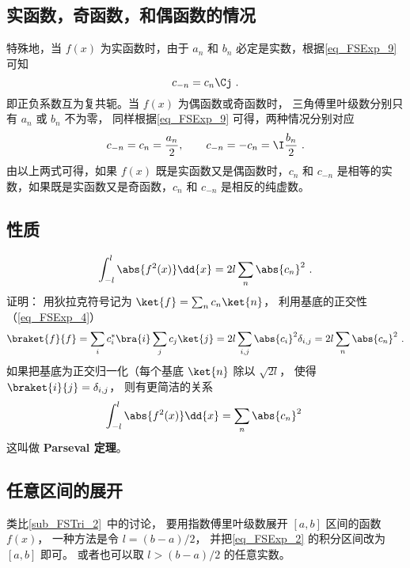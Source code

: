 \subsection{实函数，奇函数，和偶函数的情况}
特殊地，当 $f(x)$ 为实函数时，由于 $a_n$ 和 $b_n$ 必定是实数，根据\autoref{eq_FSExp_9} 可知
\begin{equation}
c_{-n} = c_{n}\Cj~.
\end{equation}
即正负系数互为复共轭。当 $f(x)$ 为偶函数或奇函数时， 三角傅里叶级数分别只有 $a_n$ 或 $b_n$ 不为零， 同样根据\autoref{eq_FSExp_9} 可得，两种情况分别对应
\begin{equation}
c_{-n} = c_n =\frac{a_n}{2}, \qquad
c_{-n} = -c_n = \I \frac{b_n}{2}~.
\end{equation}
由以上两式可得，如果 $f(x)$ 既是实函数又是偶函数时，$c_n$ 和 $c_{-n}$ 是相等的实数，如果既是实函数又是奇函数，$c_n$ 和 $c_{-n}$ 是相反的纯虚数。

\subsection{性质}
\begin{equation}
\int_{-l}^l \abs{f^2(x)} \dd{x} =  2l\sum_n \abs{c_n}^2~.
\end{equation}
证明： 用狄拉克符号记为 $\ket{f} = \sum_n c_n \ket{n}$， 利用基底的正交性（\autoref{eq_FSExp_4}）
\begin{equation}
\braket{f}{f} = \sum_i c_i^* \bra{i} \sum_j c_j \ket{j} = 2l \sum_{i,j} \abs{c_i}^2 \delta_{i,j} = 2l \sum_n \abs{c_n}^2~.
\end{equation}
如果把基底为正交归一化（每个基底 $\ket{n}$ 除以 $\sqrt{2l}$， 使得 $\braket{i}{j} = \delta_{i,j}$， 则有更简洁的关系
\begin{equation}\label{eq_FSExp_5}
\int_{-l}^l \abs{f^2(x)} \dd{x} =  \sum_n \abs{c_n}^2~
\end{equation}
这叫做 \textbf{Parseval 定理}。

\subsection{任意区间的展开}
类比\autoref{sub_FSTri_2}~中的讨论， 要用指数傅里叶级数展开 $[a, b]$ 区间的函数 $f(x)$， 一种方法是令 $l = (b - a)/2$， 并把\autoref{eq_FSExp_2} 的积分区间改为 $[a, b]$ 即可。 或者也可以取 $l > (b - a)/2$ 的任意实数。
